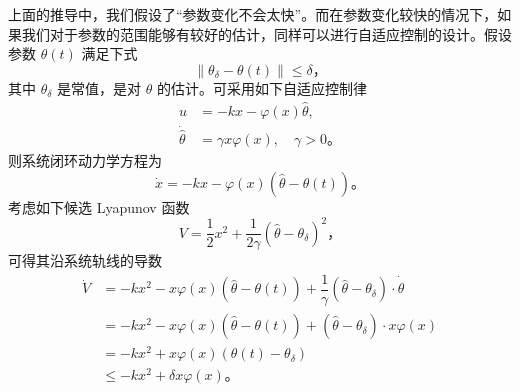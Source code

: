 上面的推导中，我们假设了“参数变化不会太快”。而在参数变化较快的情况下，如果我们对于参数的范围能够有较好的估计，同样可以进行自适应控制的设计。假设参数 $\theta(t)$ 满足下式
\[
    \| \theta_\delta - \theta(t) \| \leq \delta \text{，}
\]
其中 $\theta_\delta$ 是常值，是对 $\theta$ 的估计。可采用如下自适应控制律
\begin{align*}
    u &= -k x - \varphi(x) \hat{\theta}, \\
    \dot{\hat{\theta}} &= \gamma x \varphi(x), \quad \gamma > 0 \text{。}
\end{align*}
则系统闭环动力学方程为
\[
    \dot{x} = -k x - \varphi(x) \left( \hat{\theta} - \theta(t) \right) \text{。}
\]
考虑如下候选 Lyapunov 函数
\[
    V = \dfrac{1}{2} x^2 + \frac{1}{2 \gamma} {\left( \hat{\theta} - \theta_\delta \right)}^2 \text{，}
\]
可得其沿系统轨线的导数
\begin{align*}
    \dot{V} &= -k x^2 - x \varphi(x) \left( \hat{\theta} - \theta(t) \right) + \dfrac{1}{\gamma} \left( \hat{\theta} - \theta_\delta \right) \cdot \dot{\hat{\theta}} \\
    &= -k x^2 - x \varphi(x) \left( \hat{\theta} - \theta(t) \right) +  \left( \hat{\theta} - \theta_\delta \right) \cdot x \varphi(x) \\
    &= -k x^2 + x \varphi(x) \left( \theta(t) - \theta_\delta \right) \\
    &\leq -k x^2 + \delta x \varphi(x) \text{。}
\end{align*}
